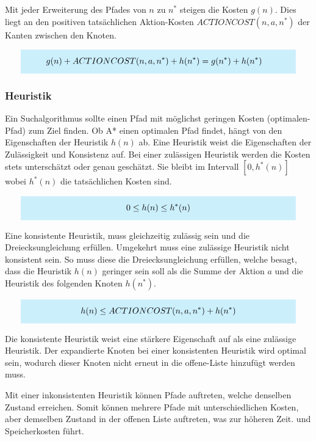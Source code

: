 Mit jeder Erweiterung des Pfades von $n$ zu $n^{\ast}$ steigen die Kosten $g(n)$. Dies liegt an den positiven tatsächlichen Aktion-Kosten $ACTIONCOST(n,a,n^*)$ der Kanten zwischen den Knoten.

\[
\highlightbox{0.9\textwidth}{$
    \begin{aligned}
			g(n) + ACTIONCOST(n,a,n^*) + h(n^*) &= g(n^*) + h(n^*)
    \end{aligned}
$}
\]

\subsubsection{Heuristik}

Ein Suchalgorithmus sollte einen Pfad mit möglichst geringen Kosten (optimalen-Pfad) zum Ziel finden. Ob A* einen optimalen Pfad findet, hängt von den Eigenschaften der Heuristik $h(n)$ ab. Eine Heuristik weist die Eigenschaften der Zulässigkeit und Konsistenz auf. Bei einer zulässigen Heuristik werden die Kosten stets unterschätzt oder genau geschätzt. Sie bleibt im Intervall $[0, h^{\ast}(n)]$ wobei $h^{\ast}(n)$ die tatsächlichen Kosten sind.

\[
\highlightbox{0.9\textwidth}{$
    \begin{aligned}
			0 \leq h(n) \leq h^*(n)
    \end{aligned}
$}
\]

Eine konsistente Heuristik, muss gleichzeitig zulässig sein und die Dreiecksungleichung erfüllen. Umgekehrt muss eine zulässige Heuristik nicht konsistent sein. So muss diese die Dreiecksungleichung erfüllen, welche besagt, dass die Heuristik $h(n)$ geringer sein soll als die Summe der Aktion $a$ und die Heuristik des folgenden Knoten $h(n^*)$.

\[
\highlightbox{0.9\textwidth}{$
    \begin{aligned}
			h(n) \leq ACTIONCOST(n,a,n^*) + h(n^*)
    \end{aligned}
$}
\]

Die konsistente Heuristik weist eine stärkere Eigenschaft auf als eine zulässige Heuristik. Der expandierte Knoten bei einer konsistenten Heuristik wird optimal sein, wodurch dieser Knoten nicht erneut in die offene-Liste hinzufügt werden muss.

Mit einer inkonsistenten Heuristik können Pfade auftreten, welche denselben Zustand erreichen. Somit können mehrere Pfade mit unterschiedlichen Kosten, aber demselben Zustand in der offenen Liste auftreten, was zur höheren Zeit. und Speicherkosten führt.

